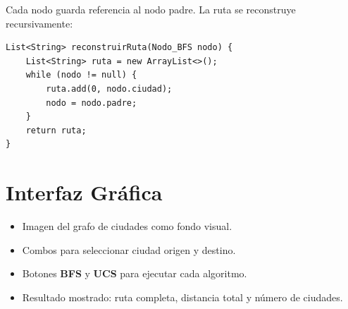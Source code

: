 \documentclass[12pt,a4paper]{article}
\begin{document}
Cada nodo guarda referencia al nodo padre. La ruta se reconstruye recursivamente:

\begin{lstlisting}
List<String> reconstruirRuta(Nodo_BFS nodo) {
    List<String> ruta = new ArrayList<>();
    while (nodo != null) {
        ruta.add(0, nodo.ciudad);
        nodo = nodo.padre;
    }
    return ruta;
}
\end{lstlisting}

\section{Interfaz Gráfica}

\begin{itemize}
  \item Imagen del grafo de ciudades como fondo visual.
  \item Combos para seleccionar ciudad origen y destino.
  \item Botones \textbf{BFS} y \textbf{UCS} para ejecutar cada algoritmo.
  \item Resultado mostrado: ruta completa, distancia total y número de ciudades.
\end{itemize}
\end{document}
